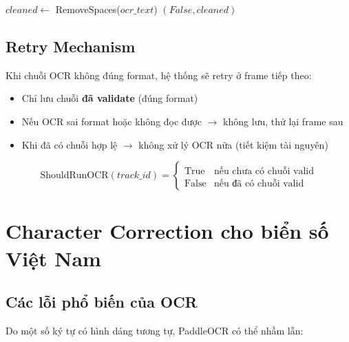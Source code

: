 \begin{algorithm}[!ht]
\SetAlgoLined
{}

$cleaned \leftarrow$ RemoveSpaces($ocr\_text$)\;
\Return $(False, cleaned)$\;
\caption{Thuật toán Validation biển số Việt Nam}
\label{alg:validation}
\end{algorithm}

\subsection{Retry Mechanism}
Khi chuỗi OCR không đúng format, hệ thống sẽ retry ở frame tiếp theo:
\begin{itemize}
    \item Chỉ lưu chuỗi \textbf{đã validate} (đúng format)
    \item Nếu OCR sai format hoặc không đọc được $\rightarrow$ không lưu, thử lại frame sau
    \item Khi đã có chuỗi hợp lệ $\rightarrow$ không xử lý OCR nữa (tiết kiệm tài nguyên)
\end{itemize}

\begin{equation}
    \text{ShouldRunOCR}(track\_id) = \begin{cases}
        \text{True} & \text{nếu chưa có chuỗi valid} \\
        \text{False} & \text{nếu đã có chuỗi valid}
    \end{cases}
\end{equation}

\section{Character Correction cho biển số Việt Nam}

\subsection{Các lỗi phổ biến của OCR}
Do một số ký tự có hình dáng tương tự, PaddleOCR có thể nhầm lẫn:

